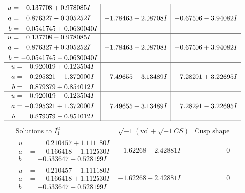 \documentclass[1p]{elsarticle_modified}
\theoremstyle{definition}
\newcommand{\I}{\sqrt{-1}}
\begin{document}
$$\begin{array}{c|c|c}
\begin{aligned}
u &= \phantom{-}0.137708 + 0.978085 I \\
a &= \phantom{-}0.876327 - 0.305252 I \\
b &= -0.0541745 + 0.0630040 I\end{aligned}
 & -1.78463 + 2.08708 I & -0.67506 - 3.94082 I \\ \hline\begin{aligned}
u &= \phantom{-}0.137708 - 0.978085 I \\
a &= \phantom{-}0.876327 + 0.305252 I \\
b &= -0.0541745 - 0.0630040 I\end{aligned}
 & -1.78463 - 2.08708 I & -0.67506 + 3.94082 I \\ \hline\begin{aligned}
u &= -0.920019 + 0.123504 I \\
a &= -0.295321 - 1.372000 I \\
b &= \phantom{-}0.879379 + 0.854012 I\end{aligned}
 & \phantom{-}7.49655 - 3.13489 I & \phantom{-}7.28291 + 3.22695 I \\ \hline\begin{aligned}
u &= -0.920019 - 0.123504 I \\
a &= -0.295321 + 1.372000 I \\
b &= \phantom{-}0.879379 - 0.854012 I\end{aligned}
 & \phantom{-}7.49655 + 3.13489 I & \phantom{-}7.28291 - 3.22695 I\\
 \hline 
 \end{array}$$\newpage$$\begin{array}{c|c|c}  
\text{Solutions to }I^u_{1}& \I (\text{vol} + \sqrt{-1}CS) & \text{Cusp shape}\\
 \hline 
\begin{aligned}
u &= \phantom{-}0.210457 + 1.111180 I \\
a &= \phantom{-}0.166418 - 1.112530 I \\
b &= -0.533647 + 0.528199 I\end{aligned}
 & -1.62268 + 2.42881 I & \phantom{-0.000000 } 0 \\ \hline\begin{aligned}
u &= \phantom{-}0.210457 - 1.111180 I \\
a &= \phantom{-}0.166418 + 1.112530 I \\
b &= -0.533647 - 0.528199 I\end{aligned}
 & -1.62268 - 2.42881 I & \phantom{-0.000000 } 0 \\ \hline\begin{aligned}

\end{aligned}
\end{array}$$
\end{document}
